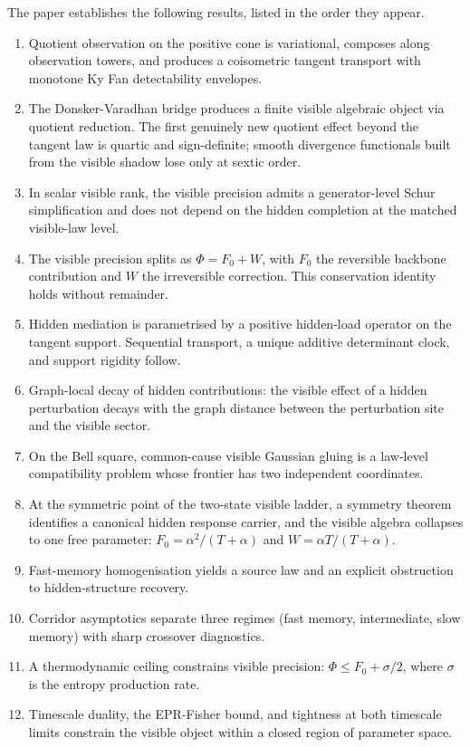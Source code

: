 \documentclass[11pt]{article}
\numberwithin{equation}{section}
\theoremstyle{thmcompact}
\theoremstyle{remark}
\begin{document}
The paper establishes the following results, listed in the order they appear.

\begin{enumerate}[label=(\roman*)]
\item Quotient observation on the positive cone is variational, composes along observation towers, and produces a coisometric tangent transport with monotone Ky Fan detectability envelopes.

\item The Donsker-Varadhan bridge produces a finite visible algebraic object via quotient reduction. The first genuinely new quotient effect beyond the tangent law is quartic and sign-definite; smooth divergence functionals built from the visible shadow lose only at sextic order.

\item In scalar visible rank, the visible precision admits a generator-level Schur simplification and does not depend on the hidden completion at the matched visible-law level.

\item The visible precision splits as $\Phi = F_0 + W$, with $F_0$ the reversible backbone contribution and $W$ the irreversible correction. This conservation identity holds without remainder.

\item Hidden mediation is parametrised by a positive hidden-load operator on the tangent support. Sequential transport, a unique additive determinant clock, and support rigidity follow.

\item Graph-local decay of hidden contributions: the visible effect of a hidden perturbation decays with the graph distance between the perturbation site and the visible sector.

\item On the Bell square, common-cause visible Gaussian gluing is a law-level compatibility problem whose frontier has two independent coordinates.

\item At the symmetric point of the two-state visible ladder, a symmetry theorem identifies a canonical hidden response carrier, and the visible algebra collapses to one free parameter: $F_0 = \alpha^2/(T+\alpha)$ and $W = \alpha T/(T+\alpha)$.

\item Fast-memory homogenisation yields a source law and an explicit obstruction to hidden-structure recovery.

\item Corridor asymptotics separate three regimes (fast memory, intermediate, slow memory) with sharp crossover diagnostics.

\item A thermodynamic ceiling constrains visible precision: $\Phi \leq F_0 + \sigma/2$, where $\sigma$ is the entropy production rate.

\item Timescale duality, the EPR-Fisher bound, and tightness at both timescale limits constrain the visible object within a closed region of parameter space.
\end{enumerate}
\end{document}
